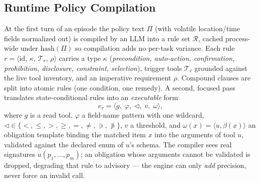 \documentclass{article}
\begin{document}
\subsection{Runtime Policy Compilation}
\label{sec:compile}
At the first turn of an episode the policy text $\Pi$ (with volatile
location/time fields normalized out) is compiled by an LLM into a rule set
$\mathcal{R}$, cached process-wide under $\mathrm{hash}(\Pi)$ so compilation
adds no per-task variance. Each rule
$r=\langle \mathrm{id},\,\kappa,\,\mathcal{T}_r,\,\rho\rangle$ carries a type
$\kappa$ (\emph{precondition, auto-action, confirmation, prohibition,
disclosure, constraint, selection}), trigger tools $\mathcal{T}_r$ grounded
against the live tool inventory, and an imperative requirement $\rho$.
Compound clauses are split into atomic rules (one condition, one remedy). A
second, focused pass translates state-conditional rules into an
\emph{executable} form
\begin{equation}
e_r=\big\langle g,\;\varphi,\;\lhd,\;v,\;\omega \big\rangle,
\label{eq:exec}
\end{equation}
where $g$ is a read tool, $\varphi$ a field-name pattern with one wildcard,
$\lhd\in\{<,\le,>,\ge,=,\ne,\ni,\not\ni\}$, $v$ a threshold, and
$\omega(x)=\langle u,\beta(x)\rangle$ an obligation template binding the
matched item $x$ into the arguments of tool $u$, validated against the
declared enum of $u$'s schema. The compiler sees real signatures
$u(p_1,\dots,p_m)$; an obligation whose arguments cannot be validated is
dropped, degrading that rule to advisory --- the engine can only \emph{add}
precision, never force an invalid call.
\end{document}
